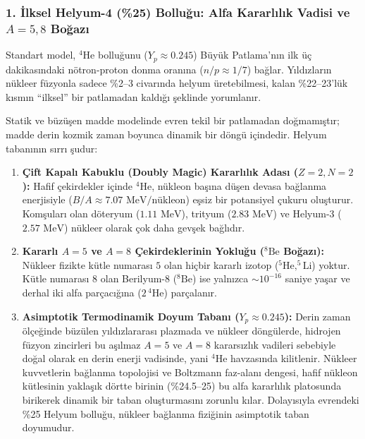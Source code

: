 \subsubsection{1. İlksel Helyum-4 (\%25) Bolluğu: Alfa Kararlılık Vadisi ve \texorpdfstring{$A=5, 8$}{A=5, 8} Boğazı}
Standart model, $^4\mathrm{He}$ bolluğunu ($Y_p \approx 0.245$) Büyük Patlama'nın ilk üç dakikasındaki nötron-proton donma oranına ($n/p \approx 1/7$) bağlar. Yıldızların nükleer füzyonla sadece \%2--3 civarında helyum üretebilmesi, kalan \%22--23'lük kısmın ``ilksel'' bir patlamadan kaldığı şeklinde yorumlanır.

Statik ve büzüşen madde modelinde evren tekil bir patlamadan doğmamıştır; madde derin kozmik zaman boyunca dinamik bir döngü içindedir. Helyum tabanının sırrı şudur:
\begin{enumerate}
    \item \textbf{Çift Kapalı Kabuklu (Doubly Magic) Kararlılık Adası ($Z=2, N=2$):} Hafif çekirdekler içinde $^4\mathrm{He}$, nükleon başına düşen devasa bağlanma enerjisiyle ($B/A \approx 7.07\text{ MeV/nükleon}$) eşsiz bir potansiyel çukuru oluşturur. Komşuları olan döteryum ($1.11\text{ MeV}$), trityum ($2.83\text{ MeV}$) ve Helyum-3 ($2.57\text{ MeV}$) nükleer olarak çok daha gevşek bağlıdır.
    \item \textbf{Kararlı $A=5$ ve $A=8$ Çekirdeklerinin Yokluğu ($^8\mathrm{Be}$ Boğazı):} Nükleer fizikte kütle numarası $5$ olan hiçbir kararlı izotop ($^5\mathrm{He}, ^5\mathrm{Li}$) yoktur. Kütle numarası $8$ olan Berilyum-8 ($^8\mathrm{Be}$) ise yalnızca $\sim 10^{-16}$ saniye yaşar ve derhal iki alfa parçacığına ($2 \, ^4\mathrm{He}$) parçalanır.
    \item \textbf{Asimptotik Termodinamik Doyum Tabanı ($Y_p \approx 0.245$):} Derin zaman ölçeğinde büzülen yıldızlararası plazmada ve nükleer döngülerde, hidrojen füzyon zincirleri bu aşılmaz $A=5$ ve $A=8$ kararsızlık vadileri sebebiyle doğal olarak en derin enerji vadisinde, yani $^4\mathrm{He}$ havzasında kilitlenir. Nükleer kuvvetlerin bağlanma topolojisi ve Boltzmann faz-alanı dengesi, hafif nükleon kütlesinin yaklaşık dörtte birinin (\%24.5--25) bu alfa kararlılık platosunda birikerek dinamik bir taban oluşturmasını zorunlu kılar. Dolayısıyla evrendeki \%25 Helyum bolluğu, nükleer bağlanma fiziğinin asimptotik taban doyumudur.
\end{enumerate}

